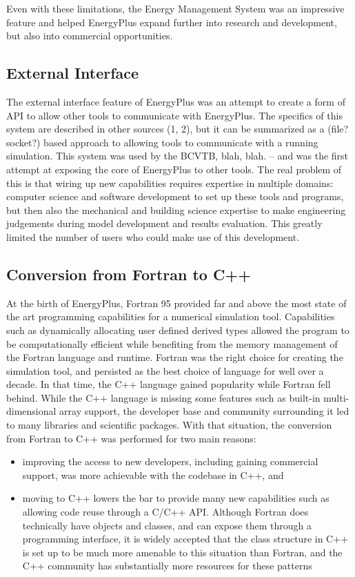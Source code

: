 \documentclass[5p]{elsarticle}
\begin{document}
Even with these limitations, the Energy Management System was an impressive feature and helped EnergyPlus expand further into research and development, but also into commercial opportunities.

  \subsection{External Interface}
The external interface feature of EnergyPlus was an attempt to create a form of API to allow other tools to communicate with EnergyPlus.  The specifics of this system are described in other sources (1, 2), but it can be summarized as a (file? socket?) based approach to allowing tools to communicate with a running simulation.  This system was used by the BCVTB, blah, blah.  -- and was the first attempt at exposing the core of EnergyPlus to other tools.  The real problem of this is that wiring up new capabilities requires expertise in multiple domains: computer science and software development to set up these tools and programs, but then also the mechanical and building science expertise to make engineering judgements during model development and results evaluation.  This greatly limited the number of users who could make use of this development.

  \subsection{Conversion from Fortran to C++}
At the birth of EnergyPlus, Fortran 95 provided far and above the most state of the art programming capabilities for a numerical simulation tool.  Capabilities such as dynamically allocating user defined derived types allowed the program to be computationally efficient while benefiting from the memory management of the Fortran language and runtime.  Fortran was the right choice for creating the simulation tool, and persisted as the best choice of language for well over a decade. In that time, the C++ language gained popularity while Fortran fell behind.  While the C++ language is missing some features such as built-in multi-dimensional array support, the developer base and community surrounding it led to many libraries and scientific packages.  With that situation, the conversion from Fortran to C++ was performed for two main reasons:
\begin{itemize}
  \item improving the access to new developers, including gaining commercial support, was more achievable with the codebase in C++, and 
  \item moving to C++ lowers the bar to provide many new capabilities such as allowing code reuse through a C/C++ API.  Although Fortran does technically have objects and classes, and can expose them through a programming interface, it is widely accepted that the class structure in C++ is set up to be much more amenable to this situation than Fortran, and the C++ community has substantially more resources for these patterns
\end{itemize}
\end{document}
